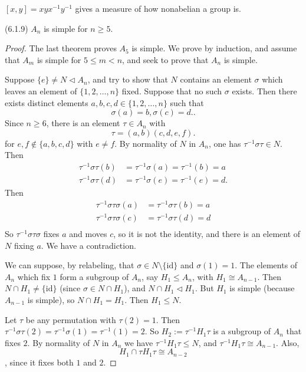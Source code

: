 
\begin{remark}[Commutator]
	$[x,y] = x y x^{-1} y^{-1} $ gives a measure of how nonabelian a group is.
\end{remark}


\begin{theorem}(6.1.9)
	$A_n$ is simple for $n\ge 5$.
\end{theorem}
\begin{proof}
	The last theorem proves $A_5$ is simple. We prove by induction, and assume that $A_m$ is simple for $5\le m<n$, and seek to prove that $A_n$ is simple.

	Suppose $\{e\} \neq N \triangleleft A_n$, and try to show that $N$ contains an element $\sigma$ which leaves an element of $\{1,2,\ldots,n\} $  fixed. Suppose that no such $\sigma$ exists. Then there exists distinct elements $a,b,c,d \in \{1,2,\ldots,n\} $ such that \[
		\sigma(a) = b, \sigma(c) = d.
	.\] 
	Since $n\ge 6$, there is an element $\tau \in A_n$ with \[
		\tau = (a,b)(c,d,e, f)
	.\] 
	for $e,f \not\in \{a,b,c,d\} $ with $e \neq f$.
	By normality of $N$ in $A_n$, one has $\tau^{-1} \sigma\tau \in N$.
	Then \begin{align*}
		\tau^{-1} \sigma\tau(b) &= \tau^{-1} \sigma(a) = \tau^{-1} (b) = a\\
		\tau^{-1} \sigma\tau(d) &= \tau^{-1} \sigma(e) = \tau^{-1} (e) = d
	.\end{align*} 
	Then
	\begin{align*}
		\tau^{-1} \sigma\tau\sigma(a) &= \tau^{-1} \sigma\tau(b) = a\\
		\tau^{-1} \sigma\tau\sigma(c) &= \tau^{-1} \sigma\tau(d) = d\\
	\end{align*}
	So $\tau^{-1} \sigma\tau\sigma$ fixes $a$ and moves $c$, so it is not the identity, and there is an element of $N$ fixing  $a$. We have a contradiction.

	We can suppose, by relabeling, that $\sigma \in N\setminus \{\text{id}\} $ and $\sigma(1) = 1$. The elements of $A_n$ which fix $1$ form a subgroup of $A_n$, say $H_1 \le A_n$, with $H_1 \cong A_{n-1}$. 
	Then $N \cap H_1 \neq \{\text{id}\} $ (since $\sigma \in N \cap H_1$), and $N \cap H_1 \triangleleft H_1$.
	But $H_1$ is simple (because $A_{n-1}$ is simple), so $N \cap H_1 = H_1$. 
	Then $H_1\le N$.

	Let $\tau$ be any permutation with $\tau(2) = 1$. Then $\tau^{-1} \sigma\tau(2) = \tau^{-1} \sigma(1) = \tau^{-1} (1) = 2$.
	So $H_2 := \tau^{-1} H_1\tau$ is a subgroup of $A_n$ that fixes $2$.
	By normality of $N$ in $A_n $ we have $\tau^{-1} H_1 \tau \le N$, and $\tau^{-1} H_1\tau \cong A_{n-1 }$.
	Also, \[
		H_1 \cap \tau H_1 \tau \cong A_{n-2}
	\],
	since it fixes both $1$ and $2$.


\end{proof}
